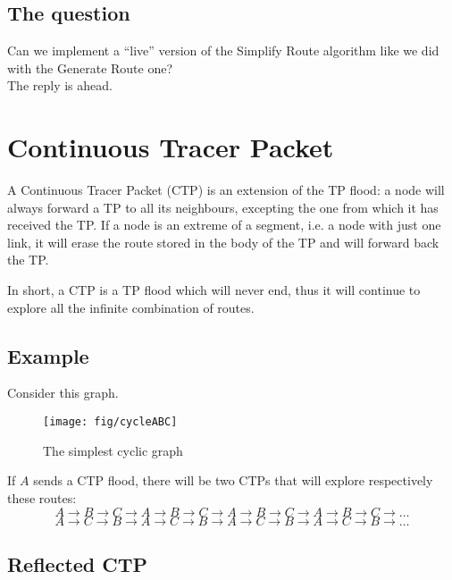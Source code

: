 \documentclass[a4paper]{article}
\begin{document}
\subsection{The question}

Can we implement a ``live'' version of the Simplify Route algorithm like we
did with the Generate Route one?\\
The reply is ahead.

\newpage
\section{Continuous Tracer Packet}
\label{sec:CTP}

A Continuous Tracer Packet (CTP) is an extension of the TP flood: a node will
always forward a TP to all its neighbours, excepting the one from which it has
received the TP.
If a node is an extreme of a segment, i.e. a node with just one link, it will
erase the route stored in the body of the TP and will forward back the TP.

In short, a CTP is a TP flood which will never end, thus it will continue to
explore all the infinite combination of routes. 

\subsection*{Example}
Consider this graph.
\begin{figure}[h]
	\begin{center}
		\texttt{[image: fig/cycleABC]}
	\end{center}
	\caption{The simplest cyclic graph}
	\label{fig:cycleABC}
\end{figure}
If $A$ sends a CTP flood, there will be two CTPs that will explore
respectively these routes:
\[
	 A \rightarrow B \rightarrow C \rightarrow A \rightarrow B \rightarrow
	 C \rightarrow A \rightarrow B \rightarrow C \rightarrow A \rightarrow
	 B \rightarrow C \rightarrow \dots
\]
\[
	 A \rightarrow C \rightarrow B \rightarrow A \rightarrow C \rightarrow
	 B \rightarrow A \rightarrow C \rightarrow B \rightarrow A \rightarrow
	 C \rightarrow B \rightarrow \dots
\]

\subsection{Reflected CTP}
\label{sec:reflected_CTP}
\end{document}
